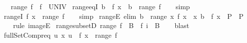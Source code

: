 \begin{isabellebody}
\isanewline
\ \ \ {\isachardoublequoteopen}range\ f\ {\isasymequiv}\ f\ {\isacharbackquote}{\kern0pt}\ UNIV{\isachardoublequoteclose}\isanewline
\isanewline
{}\isamarkupfalse%
\ range{\isacharunderscore}{\kern0pt}eqI{\isacharcolon}{\kern0pt}\ {\isachardoublequoteopen}b\ {\isacharequal}{\kern0pt}\ f\ x\ {\isasymLongrightarrow}\ b\ {\isasymin}\ range\ f{\isachardoublequoteclose}\isanewline
%
\isadelimproof
\ \ %
\endisadelimproof
%
\isatagproof
{}\isamarkupfalse%
\ simp%
\endisatagproof
{\isafoldproof}%
%
\isadelimproof
\isanewline
%
\endisadelimproof
\isanewline
{}\isamarkupfalse%
\ rangeI{\isacharcolon}{\kern0pt}\ {\isachardoublequoteopen}f\ x\ {\isasymin}\ range\ f{\isachardoublequoteclose}\isanewline
%
\isadelimproof
\ \ %
\endisadelimproof
%
\isatagproof
{}\isamarkupfalse%
\ simp%
\endisatagproof
{\isafoldproof}%
%
\isadelimproof
\isanewline
%
\endisadelimproof
\isanewline
{}\isamarkupfalse%
\ rangeE\ {\isacharbrackleft}{\kern0pt}elim{\isacharquery}{\kern0pt}{\isacharbrackright}{\kern0pt}{\isacharcolon}{\kern0pt}\ {\isachardoublequoteopen}b\ {\isasymin}\ range\ {\isacharparenleft}{\kern0pt}{\isasymlambda}x{\isachardot}{\kern0pt}\ f\ x{\isacharparenright}{\kern0pt}\ {\isasymLongrightarrow}\ {\isacharparenleft}{\kern0pt}{\isasymAnd}x{\isachardot}{\kern0pt}\ b\ {\isacharequal}{\kern0pt}\ f\ x\ {\isasymLongrightarrow}\ P{\isacharparenright}{\kern0pt}\ {\isasymLongrightarrow}\ P{\isachardoublequoteclose}\isanewline
%
\isadelimproof
\ \ %
\endisadelimproof
%
\isatagproof
{}\isamarkupfalse%
\ {\isacharparenleft}{\kern0pt}rule\ imageE{\isacharparenright}{\kern0pt}%
\endisatagproof
{\isafoldproof}%
%
\isadelimproof
\isanewline
%
\endisadelimproof
\isanewline
{}\isamarkupfalse%
\ range{\isacharunderscore}{\kern0pt}subsetD{\isacharcolon}{\kern0pt}\ {\isachardoublequoteopen}range\ f\ {\isasymsubseteq}\ B\ {\isasymLongrightarrow}\ f\ i\ {\isasymin}\ B{\isachardoublequoteclose}\isanewline
%
\isadelimproof
\ \ %
\endisadelimproof
%
\isatagproof
{}\isamarkupfalse%
\ blast%
\endisatagproof
{\isafoldproof}%
%
\isadelimproof
\isanewline
%
\endisadelimproof
\isanewline
{}\isamarkupfalse%
\ full{\isacharunderscore}{\kern0pt}SetCompr{\isacharunderscore}{\kern0pt}eq{\isacharcolon}{\kern0pt}\ {\isachardoublequoteopen}{\isacharbraceleft}{\kern0pt}u{\isachardot}{\kern0pt}\ {\isasymexists}x{\isachardot}{\kern0pt}\ u\ {\isacharequal}{\kern0pt}\ f\ x{\isacharbraceright}{\kern0pt}\ {\isacharequal}{\kern0pt}\ range\ f{\isachardoublequoteclose}\isanewline

\end{isabellebody}
